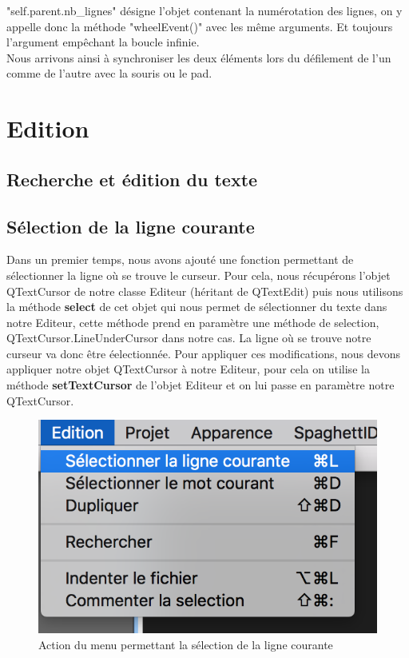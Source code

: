 \documentclass[a4paper,12pt]{article}
\begin{document}
		"self.parent.nb\_lignes" désigne l'objet contenant la numérotation des lignes, on y appelle donc la méthode "wheelEvent()" avec les même arguments. Et toujours l'argument empêchant la boucle infinie.\\
		
		Nous arrivons ainsi à synchroniser les deux éléments lors du défilement de l'un comme de l'autre avec la souris ou le pad.
		
\section{Edition}
		
	\subsection*{Recherche et édition du texte}

	\subsection{Sélection de la ligne courante}

	Dans un premier temps, nous avons ajouté une fonction permettant de sélectionner la ligne où se trouve le curseur.
	Pour cela, nous récupérons l'objet QTextCursor de notre classe Editeur (héritant de QTextEdit) puis nous utilisons la méthode \textbf{select} de cet objet qui nous permet de sélectionner du texte dans notre Editeur, cette méthode prend en paramètre une méthode de selection, QTextCursor.LineUnderCursor dans notre cas. La ligne où se trouve notre curseur va donc être éelectionnée.
	Pour appliquer ces modifications, nous devons appliquer notre objet QTextCursor à notre Editeur, pour cela on utilise la méthode \textbf{setTextCursor} de l'objet Editeur et on lui passe en paramètre notre QTextCursor.  


	\begin{figure}[h!]
		\begin{center}
			\includegraphics[scale=0.8]{images/imgs_edit/utilisation_selection_ligne}
			\caption{Action du menu permettant la sélection de la ligne courante}
		\end{center}
	\end{figure}
\end{document}
